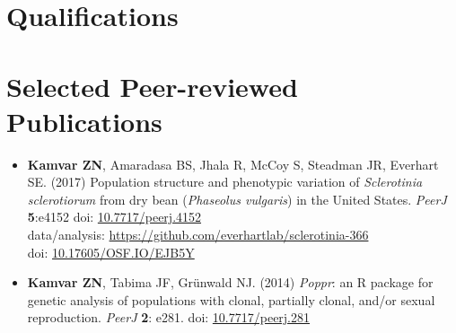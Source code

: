 \section{Qualifications}


\section{Selected Peer-reviewed Publications}

\begin{itemize}
  \item \textbf{Kamvar ZN}, Amaradasa BS, Jhala R, McCoy S, Steadman JR,
  Everhart SE. (2017) Population structure and phenotypic variation of
  \textit{Sclerotinia sclerotiorum} from dry bean (\textit{Phaseolus vulgaris})
  in the United States. \textit{PeerJ} \textbf{5}:e4152 doi: \href{https://doi.org/10.7717/peerj.4152}{10.7717/peerj.4152}\\
  data/analysis: \href{https://github.com/everhartlab/sclerotinia-366#readme}{https://github.com/everhartlab/sclerotinia-366}\\
  doi:\phantom{t/analysis:}
  \href{https://doi.org/10.17605/OSF.IO/EJB5Y}{10.17605/OSF.IO/EJB5Y}

  \item \textbf{Kamvar ZN}, Tabima JF, Gr\"unwald NJ. (2014) \textit{Poppr}: an
  R package for genetic analysis of populations with clonal, partially clonal,
  and/or sexual reproduction. \textit{PeerJ} \textbf{2}: e281. doi: \href{https://doi.org/10.7717/peerj.281}{10.7717/peerj.281}
\end{itemize}

